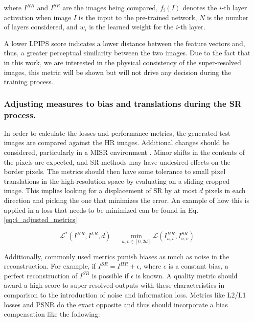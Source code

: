         where $I^{HR}$ and $I^{SR}$ are the images being compared, $f_i(I)$ denotes the $i$-th layer activation when image $I$ is the input to the pre-trained network, $N$ is the number of layers considered, and $w_i$ is the learned weight for the $i$-th layer.
        
        A lower LPIPS score indicates a lower distance between the feature vectors and, thus, a greater perceptual similarity between the two images. 
        Due to the fact that in this work, we are interested in the physical consistency of the super-resolved images, 
        this metric will be shown but will not drive any decision during the training process.
        

        \subsubsection{Adjusting measures to bias and translations during the SR process.}\label{subsec:adjustedmetrics}
    
            In order to calculate the losses and performance metrics, the generated test images are compared against the HR images.
            Additional changes should be considered, particularly in a MISR environment \cite{martens2019superresolution}.
            Minor shifts in the contents of the pixels are expected, and  SR methods may have undesired effects on the border pixels. The metrics should then have some tolerance to small pixel translations in the high-resolution space by evaluating on a sliding cropped image. 
            This implies looking for a displacement of SR by at most $d$ pixels in each direction and picking the one that minimizes the error. 
            An example of how this is applied in a loss that needs to be minimized can be found in Eq. \ref{eq:4_adjusted_metrics}
    
            \begin{equation}
               \mathcal{L}^* ( I^{HR}, I^{LR}, d) = \min_{u,v \in [0,2d]} \mathcal{L} ( I^{HR}_{u,v}, I^{SR}_{u,v})
            \label{eq:4_adjusted_metrics}
            \end{equation}
    
            Additionally, commonly used metrics punish biases as much as noise in the reconstruction.
            For example, if $I^{SR} = I^{HR} + \epsilon$, where $\epsilon$ is a constant bias, a perfect reconstruction of $I^{SR}$ is possible if $\epsilon$ is known. 
            A quality metric should award a high score to super-resolved outputs with these characteristics in comparison to the introduction of noise and information loss. Metrics like L2/L1 losses and PSNR do the exact opposite and thus should incorporate a bias compensation like the following: 
    
